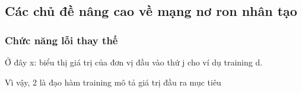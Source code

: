 \subsection{Các chủ đề nâng cao về mạng nơ ron nhân tạo}

\subsubsection{Chức năng lỗi thay thế}

Ở đây x: biểu thị giá trị của đơn vị đầu vào thứ j cho ví dụ training d.

Vì vậy, 2 là đạo hàm training mô tả giá trị đầu ra mục tiêu

